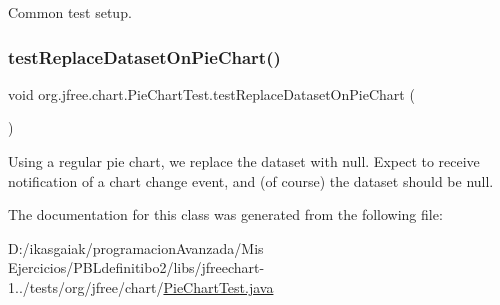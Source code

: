 Common test setup. \mbox{\label{classorg_1_1jfree_1_1chart_1_1_pie_chart_test_a97aa7bb0e350991dcfb1e3ae5efdb36f}} 
\subsubsection{\texorpdfstring{test\+Replace\+Dataset\+On\+Pie\+Chart()}{testReplaceDatasetOnPieChart()}}
{\footnotesize\ttfamily void org.\+jfree.\+chart.\+Pie\+Chart\+Test.\+test\+Replace\+Dataset\+On\+Pie\+Chart (\begin{DoxyParamCaption}{ }\end{DoxyParamCaption})}

Using a regular pie chart, we replace the dataset with null. Expect to receive notification of a chart change event, and (of course) the dataset should be null. 

The documentation for this class was generated from the following file\+:\begin{DoxyCompactItemize}
\item 
D\+:/ikasgaiak/programacion\+Avanzada/\+Mis Ejercicios/\+P\+B\+Ldefinitibo2/libs/jfreechart-\/1../tests/org/jfree/chart/\mbox{\hyperlink{_pie_chart_test_8java}{Pie\+Chart\+Test.\+java}}\end{DoxyCompactItemize}
